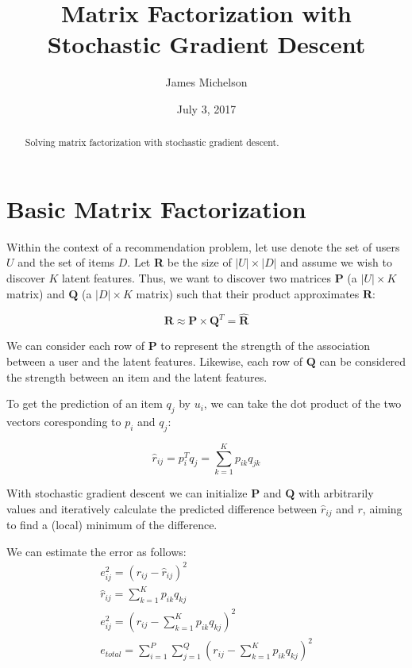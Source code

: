 \documentclass[12pt,reqno]{article}
\title{Matrix Factorization with Stochastic Gradient Descent}
\date{July 3, 2017}
\author{James Michelson}
\begin{document}
\maketitle

\begin{abstract}
Solving matrix factorization with stochastic gradient descent.
\end{abstract}

\section{Basic Matrix Factorization}

Within the context of a recommendation problem, let use denote the set of users
$U$ and the set of items $D$. Let \textbf{R} be the size of
$|\textit{U}|\times|\textit{D}|$ and assume we wish to discover $K$ latent
features. Thus, we want to discover two matrices $\mathbf{P}$ (a $|\textit{U}|\times K$ matrix)
and $\mathbf{Q}$ (a $|\textit{D}|\times K$ matrix) such that their
product approximates $\textbf{R}$:

\begin{equation}
\textbf{R} \approx \textbf{P}\times\textbf{Q}^T = \hat{\textbf{R}}
\end{equation}

We can consider each row of $\textbf{P}$ to represent the strength of the
association between a user and the latent features. Likewise, each row of
$\textbf{Q}$ can be considered the strength between an item and the latent
features.

To get the prediction of an item $q_j$ by $u_i$, we can take the dot product of
the two vectors coresponding to $p_i$ and $q_j$:

\begin{equation}
\hat{r}_{ij} = p_i^Tq_j = \sum_{k=1}^{K}p_{ik} q_{jk}
\end{equation}

With stochastic gradient descent we can initialize $\textbf{P}$ and $\textbf{Q}$
with arbitrarily values and iteratively calculate the predicted difference
between $\hat{r}_{ij}$ and $r$, aiming to find a (local) minimum of the
difference.

We can estimate the error as follows:
\begin{align}
e_{ij}^2 = (r_{ij} - \hat{r}_{ij})^2 \\
\hat{r}_{ij} = \sum_{k=1}^{K}p_{ik} q_{kj} \\
e_{ij}^2 = (r_{ij} - \sum_{k=1}^{K}p_{ik} q_{kj})^2 \\
e_{total} = \sum_{i=1}^{P} \sum_{j=1}^{Q} (r_{ij} - \sum_{k=1}^{K}p_{ik} q_{kj})^2
\end{align}
\end{document}
